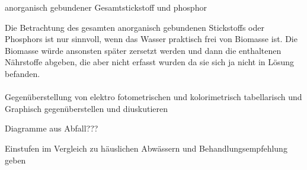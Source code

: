 anorganisch gebundener Gesamtstickstoff und phosphor

Die Betrachtung des gesamten anorganisch gebundenen Stickstoffs oder Phosphors ist nur sinnvoll, wenn das Wasser praktisch frei von Biomasse ist. Die Biomasse würde ansonsten später zersetzt werden und dann die enthaltenen Nährstoffe abgeben, die aber nicht erfasst wurden da sie sich ja nicht in Lösung befanden.\\ \\


Gegenüberstellung von elektro fotometrischen und kolorimetrisch
tabellarisch und Graphisch gegenüberstellen und diuskutieren

Diagramme aus Abfall???

Einstufen im Vergleich zu häuslichen Abwässern und Behandlungsempfehlung geben


